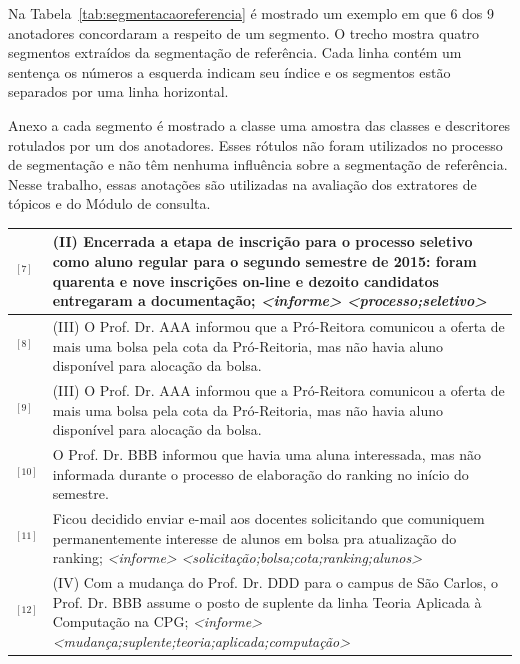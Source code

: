 Na Tabela~\ref{tab:segmentacaoreferencia} é mostrado um exemplo em que 6 dos 9 anotadores concordaram a respeito de um segmento. O trecho mostra quatro segmentos extraídos da segmentação de referência. 
Cada linha contém um sentença os números a esquerda indicam seu índice e os segmentos estão separados por uma linha horizontal.

Anexo a cada segmento é mostrado a classe uma amostra das classes e descritores rotulados por um dos anotadores. Esses rótulos não foram utilizados no processo de segmentação e não têm nenhuma influência sobre a segmentação de referência. Nesse trabalho, essas anotações são utilizadas na avaliação dos extratores de tópicos e do Módulo de consulta.

\begin{table}[!h]
	\centering 
\footnotesize
	\begin{tabular}{|p{0.2cm}p{}|} \hline


$^{[7]}$&
(II) Encerrada a etapa de inscrição para o processo seletivo como aluno regular para o segundo semestre de 2015: foram quarenta e nove inscrições on-line e dezoito candidatos entregaram a documentação; 
\textit{<informe>} \textit{<processo;seletivo>}
\\ \hline


$^{[8]}$ &
(III) O Prof. Dr. AAA informou que a Pró-Reitora comunicou a oferta de mais uma bolsa pela cota da Pró-Reitoria, mas não havia aluno disponível para alocação da bolsa.\\
$^{[9]}$ &
(III) O Prof. Dr. AAA informou que a Pró-Reitora comunicou a oferta de mais uma bolsa pela cota da Pró-Reitoria, mas não havia aluno disponível para alocação da bolsa.\\
$^{[10]}$ &
O Prof. Dr. BBB informou que havia uma aluna interessada, mas não informada durante o processo de elaboração do ranking no início do semestre.\\
$^{[11]}$ &
Ficou decidido enviar e-mail aos docentes solicitando que comuniquem permanentemente interesse de alunos em bolsa pra atualização do ranking;
\textit{<informe>} \textit{<solicitação;bolsa;cota;ranking;alunos>}
\\ \hline


$^{[12]}$ &
(IV) Com a mudança do Prof. Dr. DDD para o campus de São Carlos, o Prof. Dr. BBB assume o posto de suplente da linha Teoria Aplicada à Computação na CPG;
\textit{<informe>} \textit{<mudança;suplente;teoria;aplicada;computação>}
\\ \hline


\end{tabular}
\end{table}
